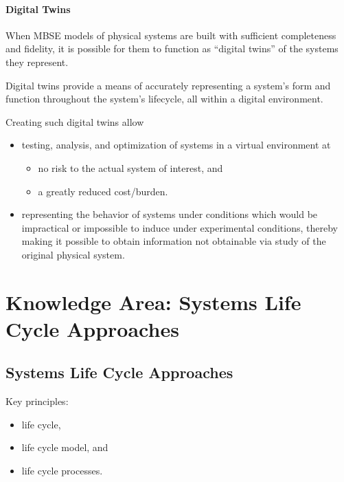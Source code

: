 \documentclass[letterpaper,10pt,english]{jupyterBook}
\begin{document}
\paragraph{Digital Twins}
\label{\detokenize{SE/sebok:digital-twins}}
\sphinxAtStartPar
When MBSE models of physical systems are built with sufficient completeness and fidelity, it is possible for them to function as “digital twins” of the systems they represent.

\sphinxAtStartPar
Digital twins provide a means of accurately representing a system’s form and function throughout the system’s lifecycle, all within a digital environment.

\sphinxAtStartPar
Creating such digital twins allow
\begin{itemize}
\item {} 
\sphinxAtStartPar
testing, analysis, and optimization of systems in a virtual environment at
\begin{itemize}
\item {} 
\sphinxAtStartPar
no risk to the actual system of interest, and

\item {} 
\sphinxAtStartPar
a greatly reduced cost/burden.

\end{itemize}

\item {} 
\sphinxAtStartPar
representing the behavior of systems under conditions which would be impractical or impossible to induce under experimental conditions, thereby making it possible to obtain information not obtainable via study of the original physical system.

\end{itemize}


\section{Knowledge Area: Systems Life Cycle Approaches}
\label{\detokenize{SE/sebok:knowledge-area-systems-life-cycle-approaches}}

\subsection{Systems Life Cycle Approaches}
\label{\detokenize{SE/sebok:systems-life-cycle-approaches}}
\sphinxAtStartPar
Key principles:
\begin{itemize}
\item {} 
\sphinxAtStartPar
life cycle,

\item {} 
\sphinxAtStartPar
life cycle model, and

\item {} 
\sphinxAtStartPar
life cycle processes.

\end{itemize}
\end{document}
